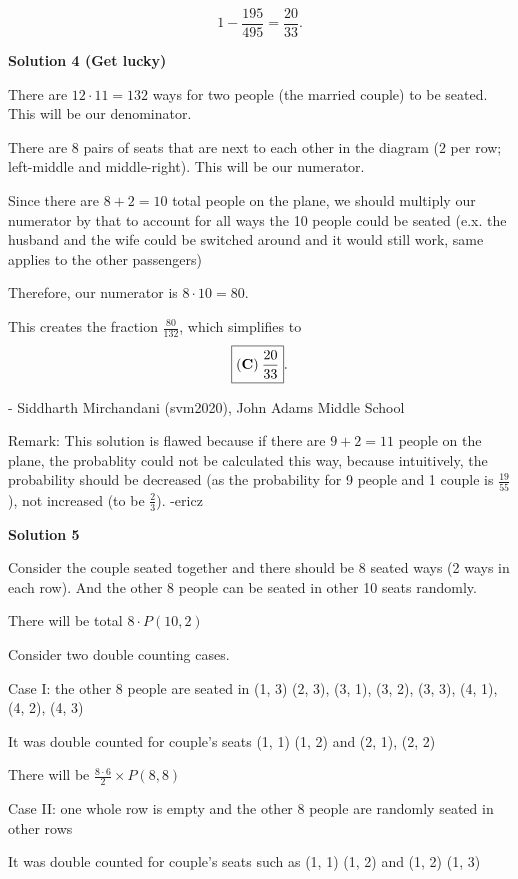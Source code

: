 \begin{enumerate}
 
 \[1 - \dfrac{195}{495} = \dfrac{20}{33}.\]




\textbf{Solution 4 (Get lucky)}

There are $12\cdot 11 = 132$ ways for two people (the married couple) to be seated. This will be our denominator.

 There are $8$ pairs of seats that are next to each other in the diagram ($2$ per row; left-middle and middle-right). This will be our numerator.

 Since there are $8+2=10$ total people on the plane, we should multiply our numerator by that to account for all ways the 10 people could be seated (e.x. the husband and the wife could be switched around and it would still work, same applies to the other passengers)

 Therefore, our numerator is $8 \cdot 10 = 80$.

 This creates the fraction $\frac{80}{132}$, which simplifies to
 \[\boxed{(\text{\textbf{C}}) \: \frac{20}{33}}.\]

 - Siddharth Mirchandani (svm2020), John Adams Middle School

 
Remark: This solution is flawed because if there are $9+2=11$ people on the plane, the probablity could not be calculated this way, because intuitively, the probability should be decreased (as the probability for 9 people and 1 couple is $\frac{19}{55}$), not increased (to be $\frac{2}{3}$). -ericz

 



\textbf{Solution 5}

Consider the couple seated together and there should be 8 seated ways (2 ways in each row). And the other 8 people can be seated in other 10 seats randomly. 

 There will be total $8\cdot P(10, 2)$

 Consider two double counting cases.

 
Case I: the other 8 people are seated in (1, 3) (2, 3), (3, 1), (3, 2), (3, 3), (4, 1), (4, 2), (4, 3)

 It was double counted for couple's seats (1, 1) (1, 2) and (2, 1), (2, 2)

 There will be $\frac{8\cdot 6}{2}\times P(8, 8)$

 
Case II: one whole row is empty and the other 8 people are randomly seated in other rows

 It was double counted for couple's seats such as (1, 1) (1, 2) and (1, 2) (1, 3)


\end{enumerate}
